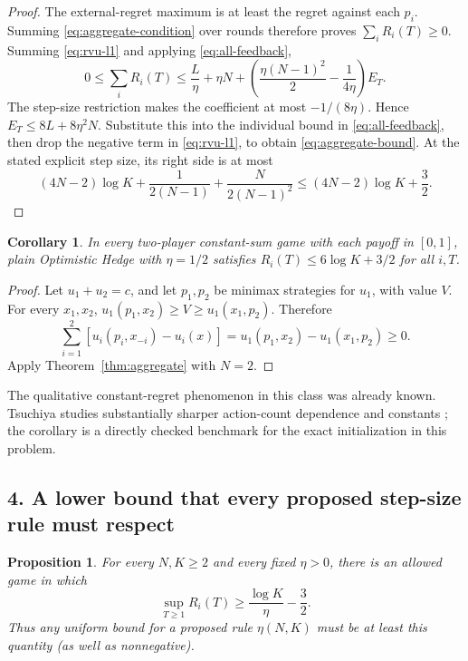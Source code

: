 \documentclass[11pt]{article}
\newtheorem{proposition}[theorem]{Proposition}
\newtheorem{corollary}[theorem]{Corollary}
\begin{document}
\begin{proof}
The external-regret maximum is at least the regret against each $p_i$.
Summing \eqref{eq:aggregate-condition} over rounds therefore proves
$\sum_iR_i(T)\geq0$. Summing \eqref{eq:rvu-l1} and applying
\eqref{eq:all-feedback},
\[
 0\leq\sum_iR_i(T)
 \leq\frac L\eta+\eta N+
 \left(\frac{\eta(N-1)^2}{2}-\frac1{4\eta}\right)E_T.
\]
The step-size restriction makes the coefficient at most $-1/(8\eta)$.
Hence $E_T\leq8L+8\eta^2N$. Substitute this into the individual bound in
\eqref{eq:all-feedback}, then drop the negative term in
\eqref{eq:rvu-l1}, to obtain \eqref{eq:aggregate-bound}.
At the stated explicit step size, its right side is at most
\[
 (4N-2)\log K+\frac1{2(N-1)}+\frac{N}{2(N-1)^2}
 \leq(4N-2)\log K+\frac32.
\]
\end{proof}

\begin{corollary}\label{cor:zero-sum}
In every two-player constant-sum game with each payoff in $[0,1]$,
plain Optimistic Hedge with $\eta=1/2$ satisfies
$R_i(T)\leq6\log K+3/2$ for all $i,T$.
\end{corollary}

\begin{proof}
Let $u_1+u_2=c$, and let $p_1,p_2$ be minimax strategies for $u_1$,
with value $V$. For every $x_1,x_2$,
$u_1(p_1,x_2)\geq V\geq u_1(x_1,p_2)$. Therefore
\[
 \sum_{i=1}^2[u_i(p_i,x_{-i})-u_i(x)]
 =u_1(p_1,x_2)-u_1(x_1,p_2)\geq0.
\]
Apply Theorem~\ref{thm:aggregate} with $N=2$.
\end{proof}
The qualitative constant-regret phenomenon in this class was already known.
Tsuchiya studies substantially sharper action-count dependence and constants
\cite{tsuchiya}; the corollary is a directly checked benchmark for the exact
initialization in this problem.

\subsection*{4. A lower bound that every proposed step-size rule must respect}

\begin{proposition}\label{prop:lower}
For every $N,K\geq2$ and every fixed $\eta>0$, there is an allowed game in
which
\[
 \sup_{T\geq1}R_i(T)\geq\frac{\log K}{\eta}-\frac32.
\]
Thus any uniform bound for a proposed rule $\eta(N,K)$ must be at least
this quantity (as well as nonnegative).
\end{proposition}
\end{document}
